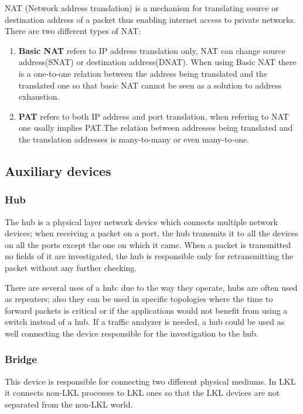 \begin{itemize}
NAT (Network address translation) is a mechanism for translating source or destination address of a packet thus enabling internet access to private networks. There are two different types of NAT:
\begin{enumerate}
\item \textbf{Basic NAT} refers to IP address translation only, NAT can change source address(SNAT) or destination address(DNAT). When using Basic NAT there is a one-to-one relation between the address being translated and the translated one so that basic NAT cannot be seen as a solution to address exhaustion.
\item \textbf{PAT} refers to both IP address and port translation, when refering to NAT one usally implies PAT.The relation between addresses being translated and the translation addresses is many-to-many or even many-to-one.
\end{enumerate}

\subsection{Auxiliary devices}
\label{sub-sec:auxdev}

\subsubsection{Hub}
The hub is a physical layer network device which connects multiple network devices; when receiving a packet on a port, the hub transmits it to all the devices on all the ports except the one on which it came. When a packet is transmitted no fields of it are investigated, the hub is responsible only for retransmitting the packet without any further checking.

There are several uses of a hub: due to the way they operate, hubs are often used as repeaters; also they can be used in specific topologies where the time to forward packets is critical or if the applications would not benefit from using a switch instead of a hub. If a traffic analyzer is needed, a hub could be used as well connecting the device responsible for the investigation to the hub.
\subsubsection{Bridge}
This device is responsible for connecting two different physical mediums. In LKL it connects non-LKL processes to LKL ones so that the LKL devices are not separated from the non-LKL world.

\end{itemize}
